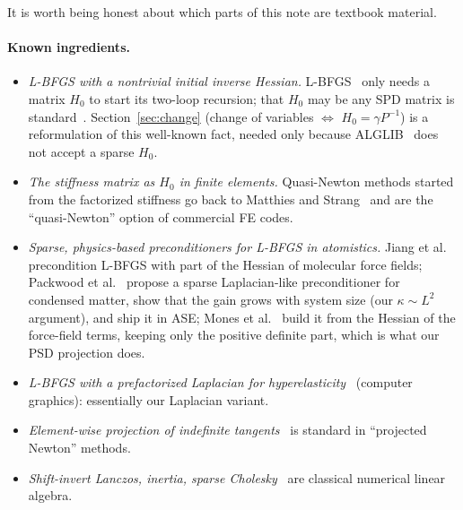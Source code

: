 \documentclass[11pt,a4paper]{article}
\theoremstyle{remark}
\begin{document}
It is worth being honest about which parts of this note are textbook material.

\paragraph{Known ingredients.}
\begin{itemize}[leftmargin=*]
\item \emph{L-BFGS with a nontrivial initial inverse Hessian.} L-BFGS~\cite{nocedal1980,liu1989}
only needs a matrix $H_0$ to start its two-loop recursion; that $H_0$ may be any SPD matrix is
standard~\cite{nocedal2006}. Section~\ref{sec:change} (change of variables $\Leftrightarrow$ $H_0=\gamma P^{-1}$) is a
reformulation of this well-known fact, needed only because ALGLIB~\cite{alglib} does not accept a
sparse $H_0$.
\item \emph{The stiffness matrix as $H_0$ in finite elements.} Quasi-Newton methods started from
the factorized stiffness go back to Matthies and Strang~\cite{matthies1979} and are the
``quasi-Newton'' option of commercial FE codes.
\item \emph{Sparse, physics-based preconditioners for L-BFGS in atomistics.} Jiang et
al.~\cite{jiang2004} precondition L-BFGS with part of the Hessian of molecular force fields;
Packwood et al.~\cite{packwood2016} propose a sparse Laplacian-like preconditioner for condensed
matter, show that the gain grows with system size (our $\kappa\sim L^2$ argument), and ship it in
ASE; Mones et al.~\cite{mones2018} build it from the Hessian of the force-field terms, keeping
only the positive definite part, which is what our PSD projection does.
\item \emph{L-BFGS with a prefactorized Laplacian for hyperelasticity}~\cite{liu2017}
(computer graphics): essentially our Laplacian variant.
\item \emph{Element-wise projection of indefinite tangents}~\cite{teran2005} is standard in
``projected Newton'' methods.
\item \emph{Shift-invert Lanczos, inertia, sparse Cholesky}~\cite{ericsson1980,grimes1994,chen2008,amestoy1996}
are classical numerical linear algebra.
\end{itemize}
\end{document}
